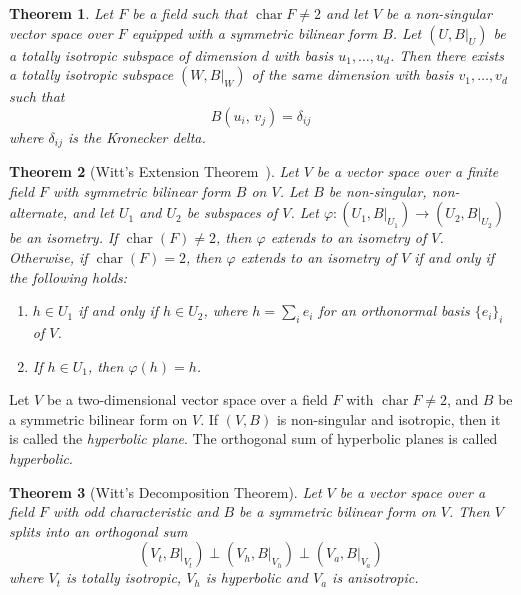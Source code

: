\documentclass{article}
\newtheorem{theorem}{Theorem}[section]
\theoremstyle{definition}
\theoremstyle{remark}
\begin{document}
\begin{theorem}\cite{L-2005}\label{Witt_basis}
Let $F$ be a field such that $\operatorname{char}F\ne 2$ and let $V$ be a non-singular vector space over $F$ equipped with a symmetric bilinear form $B$. Let $(U, B|_U)$ be a totally isotropic subspace of dimension $d$ with basis $u_1, \ldots, u_d$. Then there exists a totally isotropic subspace $(W, B|_W)$ of the same dimension with basis $v_1, \ldots, v_d$ such that
\[
B(u_i,\,v_j)=\delta_{ij}
\]
where $\delta_{ij}$ is the Kronecker delta.
\end{theorem}

\begin{theorem}[Witt's Extension Theorem~\cite{P-1964}]\label{witt_e}
    Let $V$ be a vector space over a finite field $F$ with symmetric bilinear form $B$ on $V$. Let $B$ be non-singular, non-alternate, and let $U_1$ and $U_2$ be subspaces of $V$. Let $\varphi:(U_1, B|_{U_1})\to (U_2, B|_{U_2})$ be an isometry. If $\operatorname{char}(F)\ne 2$, then $\varphi$ extends to an isometry of $V$. Otherwise, if $\operatorname{char}(F)= 2$, then $\varphi$ extends to an isometry of $V$ if and only if the following holds:
    \begin{enumerate}
        \item $h\in U_1$ if and only if $h\in U_2$, where $h=\sum_ie_i$ for an orthonormal basis $\{e_i\}_i$ of $V$.
        \item If $h\in U_1$, then $\varphi(h)=h$.
    \end{enumerate}
\end{theorem}

Let $V$ be a two-dimensional vector space over a field $F$ with $\operatorname{char}F\ne 2$, and $B$ be a symmetric bilinear form on $V$. If $(V, B)$ is non-singular and isotropic, then it is called the \textit{hyperbolic plane}. The orthogonal sum of hyperbolic planes is called \textit{hyperbolic}.

\begin{theorem}[Witt's Decomposition Theorem]\label{Witt}
Let $V$ be a vector space over a field $F$ with odd characteristic and $B$ be a symmetric bilinear form on $V$. Then $V$ splits into an orthogonal sum
\begin{equation}\label{Wittdecom}
(V_t, B|_{V_t})\perp (V_h, B|_{V_h})\perp (V_a, B|_{V_a})
\end{equation}
where $V_t$ is totally isotropic, $V_h$ is hyperbolic and $V_a$ is anisotropic.
\end{theorem}
\end{document}
